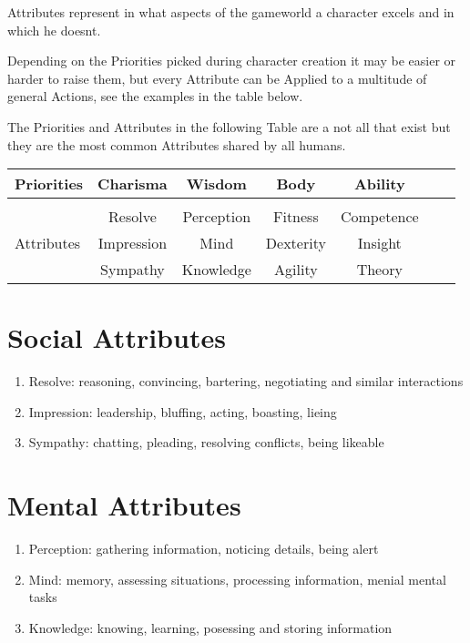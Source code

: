 Attributes represent in what aspects of the gameworld a character excels and in which he doesnt.\par
Depending on the Priorities picked during character creation it may be easier or harder to raise them, but every
Attribute can be Applied to a multitude of general Actions, see the examples in the table below.\par
The Priorities and Attributes in the following Table are a not all that exist
but they are the most common Attributes shared by all humans.\par
\begin{tabular}{l||cccccc}
    Priorities      &Charisma      &Wisdom         &Body        &Ability    \\\hline\\
                    &Resolve       &Perception     &Fitness     &Competence   \\
    Attributes      &Impression    &Mind         &Dexterity   &Insight   \\
                    &Sympathy      &Knowledge      &Agility     &Theory   \\



\end{tabular}\vspace{1cm}
\section{Social Attributes}\label{sec:charisma-attributes}
\begin{enumerate}[label= -]
    \item {Resolve}: reasoning, convincing, bartering, negotiating and similar interactions
    \item {Impression}: leadership, bluffing, acting, boasting, lieing
    \item {Sympathy}: chatting, pleading, resolving conflicts, being likeable
\end{enumerate}
\section{Mental Attributes}\label{sec:mental-attributes}
\begin{enumerate}[label=-]
    \item {Perception}: gathering information, noticing details, being alert
    \item {Mind}: memory, assessing situations, processing information, menial mental tasks
    \item {Knowledge}: knowing, learning, posessing and storing information
\end{enumerate}
